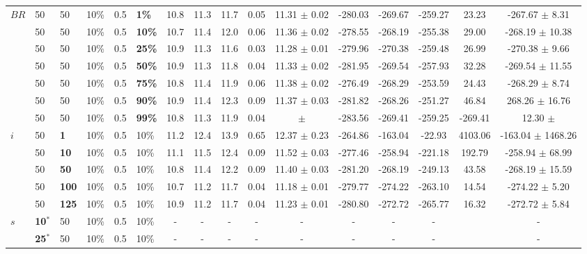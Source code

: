 \begin{sidewaystable}
\begin{tabular}{|l|l|l|l|l|l||c|c|c|c|c|c|c|c|c|c|}
    \hline
    $BR$ & 50 & 50 & 10\% & 0.5 & \textbf{1\%} & 10.8 & 11.3 & 11.7 & 0.05 & 11.31 $\pm$ 0.02 & -280.03 & -269.67 & -259.27 & 23.23 & -267.67 $\pm$ 8.31 \\
    ~    & 50 & 50 & 10\% & 0.5 & \textbf{10\%} & 10.7 & 11.4 & 12.0 & 0.06 & 11.36 $\pm$ 0.02 & -278.55 & -268.19 & -255.38 & 29.00 & -268.19 $\pm$ 10.38 \\
    ~    & 50 & 50 & 10\% & 0.5 & \textbf{25\%} & 10.9 & 11.3 & 11.6 & 0.03 & 11.28 $\pm$ 0.01 & -279.96 & -270.38 & -259.48 & 26.99 & -270.38 $\pm$ 9.66 \\
    ~    & 50 & 50 & 10\% & 0.5 & \textbf{50\%} & 10.9 & 11.3 & 11.8 & 0.04 & 11.33 $\pm$ 0.02 & -281.95 & -269.54 & -257.93 & 32.28 & -269.54 $\pm$ 11.55 \\
    ~    & 50 & 50 & 10\% & 0.5 & \textbf{75\%} & 10.8 & 11.4 & 11.9 & 0.06 & 11.38 $\pm$ 0.02 & -276.49 & -268.29 & -253.59 & 24.43 & -268.29 $\pm$ 8.74 \\
    ~    & 50 & 50 & 10\% & 0.5 & \textbf{90\%} & 10.9 & 11.4 & 12.3 & 0.09 & 11.37 $\pm$ 0.03 & -281.82 & -268.26 & -251.27 & 46.84 & 268.26 $\pm$ 16.76 \\
    ~    & 50 & 50 & 10\% & 0.5 & \textbf{99\%} & 10.8 & 11.3 & 11.9 & 0.04 &  $\pm$  &  -283.56 & -269.41 & -259.25 & -269.41 & 12.30 $\pm$  \\
    \hline
    $i$ & 50 & \textbf{1} & 10\% & 0.5 & 10\% & 11.2 & 12.4 & 13.9 & 0.65 & 12.37 $\pm$ 0.23 & -264.86 & -163.04 & -22.93 & 4103.06 & -163.04 $\pm$ 1468.26 \\
    ~   & 50 &\textbf{10} & 10\% & 0.5 & 10\% & 11.1 & 11.5 & 12.4 & 0.09 & 11.52 $\pm$ 0.03 & -277.46 & -258.94 & -221.18 & 192.79 & -258.94 $\pm$ 68.99 \\
    ~   & 50 &\textbf{50} & 10\% & 0.5 & 10\% & 10.8 & 11.4 & 12.2 & 0.09 & 11.40 $\pm$ 0.03 & -281.20 & -268.19 & -249.13 &  43.58 & -268.19 $\pm$ 15.59 \\
    ~   & 50 &\textbf{100} & 10\% & 0.5 & 10\% & 10.7 & 11.2 & 11.7 & 0.04 & 11.18 $\pm$ 0.01 & -279.77 & -274.22 & -263.10 & 14.54 & -274.22 $\pm$ 5.20 \\
    ~   & 50 &\textbf{125} & 10\% & 0.5 & 10\% & 10.9 & 11.2 & 11.7 & 0.04 & 11.23 $\pm$ 0.01 & -280.80 & -272.72 & -265.77 & 16.32 & -272.72 $\pm$ 5.84 \\
    \hline
    $s$ & \textbf{10$^*$} & 50 & 10\% & 0.5 & 10\% & - & - & - & - & - & - & - & - &  & - \\
    ~ & \textbf{25$^*$} & 50 & 10\% & 0.5 & 10\% & - & - & - & - & - & - & - & - &  & -  \\

\end{tabular}
\end{sidewaystable}
